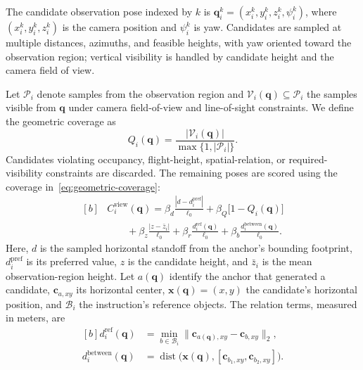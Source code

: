 \documentclass[letterpaper,10pt,journal]{IEEEtran}
\begin{document}
The candidate observation pose indexed by $k$ is $\mathbf{q}_i^k=(x_i^k,y_i^k,z_i^k,\psi_i^k)$, where $(x_i^k,y_i^k,z_i^k)$ is the camera position and $\psi_i^k$ is yaw. Candidates are sampled at multiple distances, azimuths, and feasible heights, with yaw oriented toward the observation region; vertical visibility is handled by candidate height and the camera field of view.

Let $\mathcal P_i$ denote samples from the observation region and $\mathcal V_i(\mathbf{q})\subseteq\mathcal P_i$ the samples visible from $\mathbf{q}$ under camera field-of-view and line-of-sight constraints. We define the geometric coverage as
\begin{equation}
Q_i(\mathbf{q})=
\frac{\lvert\mathcal V_i(\mathbf{q})\rvert}
{\max\{1,\lvert\mathcal P_i\rvert\}}.
\label{eq:geometric-coverage}
\end{equation}
Candidates violating occupancy, flight-height, spatial-relation, or required-visibility constraints are discarded. The remaining poses are scored using the coverage in~\eqref{eq:geometric-coverage}:
\begin{equation}
\begin{aligned}[b]
&C_i^{\mathrm{view}}(\mathbf{q})=
\beta_d\frac{|d-d_i^{\mathrm{pref}}|}{\ell_0}
+\beta_Q\bigl[1-Q_i(\mathbf{q})\bigr]\\
&\qquad{}+\beta_z\frac{|z-\bar z_i|}{\ell_0}
+\beta_r\frac{d_i^{\mathrm{ref}}(\mathbf{q})}{\ell_0}
+\beta_b\frac{d_i^{\mathrm{between}}(\mathbf{q})}{\ell_0}.
\end{aligned}
\label{eq:view-cost}
\end{equation}
Here, $d$ is the sampled horizontal standoff from the anchor's bounding footprint, $d_i^{\mathrm{pref}}$ is its preferred value, $z$ is the candidate height, and $\bar z_i$ is the mean observation-region height. Let $a(\mathbf q)$ identify the anchor that generated a candidate, $\mathbf c_{a,xy}$ its horizontal center, $\mathbf x(\mathbf q)=(x,y)$ the candidate's horizontal position, and $\mathcal B_i$ the instruction's reference objects. The relation terms, measured in meters, are
\begin{equation}
\begin{aligned}[b]
d_i^{\mathrm{ref}}(\mathbf q)
&=\min_{b\in\mathcal B_i}\|\mathbf c_{a(\mathbf q),xy}-\mathbf c_{b,xy}\|_2,\\
d_i^{\mathrm{between}}(\mathbf q)
&=\operatorname{dist}\bigl(\mathbf x(\mathbf q),
[\mathbf c_{b_1,xy},\mathbf c_{b_2,xy}]\bigr).
\end{aligned}
\label{eq:relation-costs}
\end{equation}
\end{document}
